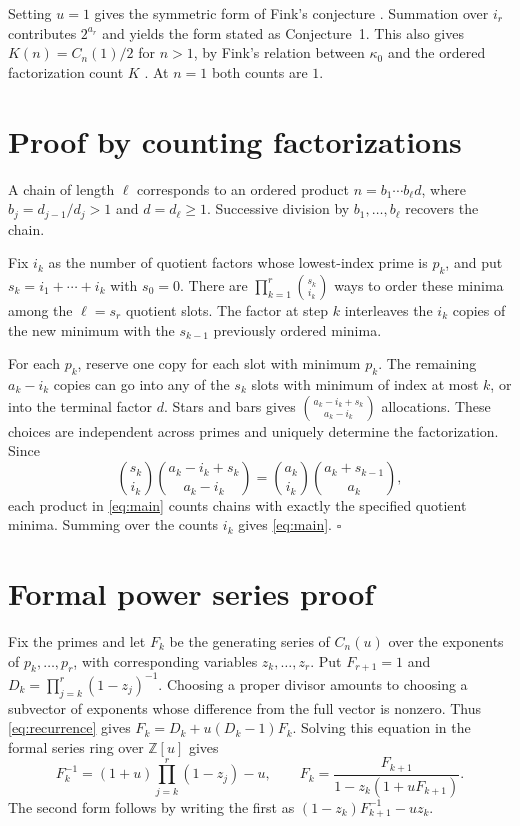 \documentclass[11pt,letterpaper]{article}
\begin{document}
Setting $u=1$ gives the symmetric form of Fink's conjecture
\cite[\S\,5]{fink}. Summation over $i_r$ contributes $2^{a_r}$ and yields
the form stated as Conjecture~1. This also gives $K(n)=C_n(1)/2$ for
$n>1$, by Fink's relation between $\kappa_0$ and the ordered factorization
count $K$ \cite[\S\,1]{fink}. At $n=1$ both counts are $1$.

\section{Proof by counting factorizations}

A chain of length $\ell$ corresponds to an ordered product
$n=b_1\cdots b_\ell d$, where $b_j=d_{j-1}/d_j>1$ and $d=d_\ell\ge 1$.
Successive division by $b_1,\ldots,b_\ell$ recovers the chain.

Fix $i_k$ as the number of quotient factors whose lowest-index prime is
$p_k$, and put $s_k=i_1+\cdots+i_k$ with $s_0=0$. There are
$\prod_{k=1}^r\binom{s_k}{i_k}$ ways to order these minima among the
$\ell=s_r$ quotient slots. The factor at step $k$ interleaves the $i_k$
copies of the new minimum with the $s_{k-1}$ previously ordered minima.

For each $p_k$, reserve one copy for each slot with minimum $p_k$.
The remaining $a_k-i_k$ copies can go into any of the $s_k$ slots with
minimum of index at most $k$, or into the terminal factor $d$. Stars and
bars gives $\binom{a_k-i_k+s_k}{a_k-i_k}$ allocations. These choices are
independent across primes and uniquely determine the factorization. Since
\[
\binom{s_k}{i_k}\binom{a_k-i_k+s_k}{a_k-i_k}
=\binom{a_k}{i_k}\binom{a_k+s_{k-1}}{a_k},
\]
each product in \eqref{eq:main} counts chains with exactly the specified
quotient minima. Summing over the counts $i_k$ gives \eqref{eq:main}.
\hfill$\square$

\section{Formal power series proof}

Fix the primes and let $F_k$ be the generating series of $C_n(u)$ over
the exponents of $p_k,\ldots,p_r$, with corresponding variables
$z_k,\ldots,z_r$. Put $F_{r+1}=1$ and $D_k=\prod_{j=k}^r(1-z_j)^{-1}$.
Choosing a proper divisor amounts to choosing a subvector of exponents
whose difference from the full vector is nonzero. Thus
\eqref{eq:recurrence} gives $F_k=D_k+u(D_k-1)F_k$. Solving this equation
in the formal series ring over $\mathbb Z[u]$ gives
\begin{equation}
F_k^{-1}=(1+u)\prod_{j=k}^r(1-z_j)-u,
\qquad
F_k=\frac{F_{k+1}}{1-z_k(1+uF_{k+1})}.
\label{eq:series}
\end{equation}
The second form follows by writing the first as
$(1-z_k)F_{k+1}^{-1}-uz_k$.
\end{document}
